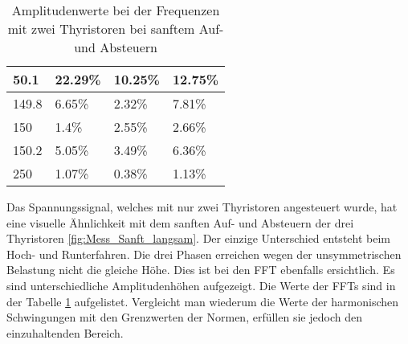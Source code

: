 \begin{table}[ht!]
\begin{tabular}{|l|l|l|l|}
		50.1              & 22.29\%                                                                             & 10.25\%                                                                             & 12.75\%                                                                             \\ \hline
		149.8             & 6.65\%                                                                              & 2.32\%                                                                              & 7.81\%                                                                              \\ \hline
		150               & 1.4\%                                                                               & 2.55\%                                                                              & 2.66\%                                                                              \\ \hline
		150.2             & 5.05\%                                                                              & 3.49\%                                                                              & 6.36\%                                                                              \\ \hline
		250             & 1.07\%                                                                              & 0.38\%                                                                              & 1.13\%                                                                              \\ \hline
		
	\end{tabular}
\caption{Amplitudenwerte bei der Frequenzen mit zwei Thyristoren bei sanftem Auf- und Absteuern}\label{tab:Mess_2Thyristoren_Spannung_Widerstand_AufAb_sanft}
\end{table}

Das Spannungssignal, welches mit nur zwei Thyristoren angesteuert wurde, hat eine visuelle Ähnlichkeit mit dem sanften Auf- und Absteuern der drei Thyristoren \ref{fig:Mess_Sanft_langsam}. Der einzige Unterschied entsteht beim Hoch- und Runterfahren. Die drei Phasen erreichen wegen der unsymmetrischen Belastung nicht die gleiche Höhe. Dies ist bei den FFT ebenfalls ersichtlich. Es sind unterschiedliche Amplitudenhöhen aufgezeigt. Die Werte der FFTs sind in der Tabelle \ref{tab:Mess_2Thyristoren_Spannung_Widerstand_AufAb_sanft} aufgelistet. Vergleicht man wiederum die Werte der harmonischen Schwingungen mit den Grenzwerten der Normen, erfüllen sie jedoch den einzuhaltenden Bereich.


